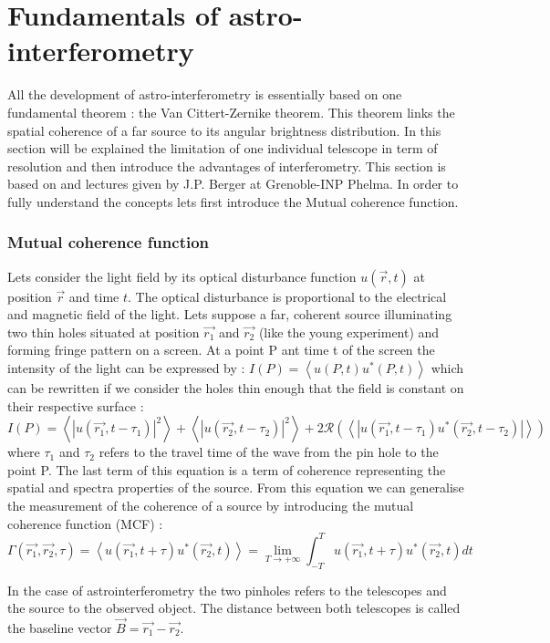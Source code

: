 \section{Fundamentals of astro-interferometry}
All the development of astro-interferometry is essentially based on one fundamental theorem : the Van Cittert-Zernike theorem. This theorem links the spatial coherence of a far source to its angular brightness distribution. In this section will be explained the limitation of one individual telescope in term of resolution and then introduce the advantages of interferometry. This section is based on \cite{Glindemann} and lectures given by J.P. Berger at Grenoble-INP Phelma. In order to fully understand the concepts lets first introduce the Mutual coherence function.

	\subsubsection{Mutual coherence function}
Lets consider the light field by its optical disturbance function $u(\vec{r},t)$ at position $\vec{r}$ and time $t$. The optical disturbance is proportional to the electrical and magnetic field of the light.
Lets suppose a far, coherent source illuminating two thin holes situated at position $\vec{r_1}$ and $\vec{r_2}$ (like the young experiment) and forming fringe pattern on a screen. At a point P ant time t of the screen the intensity of the light can be expressed by :
$I(P) = \left< u(P,t)u^*(P,t) \right>$ which can be rewritten if we consider the holes thin enough that the field is constant on their respective surface :
$$
I(P) = \left< \left| u(\vec{r_1},t-\tau_1) \right|^2 \right> + \left< \left| u(\vec{r_2},t-\tau_2) \right|^2 \right> +2\mathcal{R}\left( \left< \left| u(\vec{r_1},t-\tau_1)u^*(\vec{r_2},t-\tau_2) \right| \right> \right)
$$
where $\tau_1$ and $\tau_2$ refers to the travel time of the wave from the pin hole to the point P. The last term of this equation is a term of coherence representing the spatial and spectra properties of the source. From this equation we can generalise the measurement of the coherence of a source by introducing the mutual coherence function (MCF) :
\begin{equation}
\Gamma(\vec{r_1},\vec{r_2}, \tau) = \left< u(\vec{r_1},t+\tau)u^*(\vec{r_2},t)\right> = \lim\limits_{T\rightarrow +\infty}\int_{-T}^T u(\vec{r_1},t+\tau)u^*(\vec{r_2},t)dt
\end{equation} 

In the case of astrointerferometry the two pinholes refers to the telescopes and the source to the observed object. The distance between both telescopes is called the baseline vector $\vec{B}=\vec{r_1}-\vec{r_2}$. 

